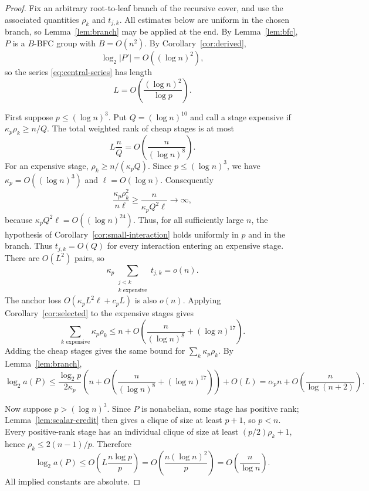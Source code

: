 \documentclass[10pt,a4paper]{amsart}
\begin{document}
\begin{proof}
Fix an arbitrary root-to-leaf branch of the recursive cover, and use the associated quantities $\rho_k$ and $t_{j,k}$. All estimates below are uniform in the chosen branch, so Lemma~\ref{lem:branch} may be applied at the end. By Lemma~\ref{lem:bfc}, $P$ is a $B$-BFC group with $B=O(n^2)$. By Corollary~\ref{cor:derived},
\[
\log_2|P'|=O((\log n)^2),
\]
so the series \eqref{eq:central-series} has length
\[
L=O\!\left(\frac{(\log n)^2}{\log p}\right).
\]

First suppose $p\le(\log n)^3$. Put $Q=(\log n)^{10}$ and call a stage expensive if $\kappa_p\rho_k\ge n/Q$. The total weighted rank of cheap stages is at most
\[
L\frac nQ=O\!\left(\frac{n}{(\log n)^8}\right).
\]
For an expensive stage, $\rho_k\ge n/(\kappa_pQ)$. Since $p\le(\log n)^3$, we have $\kappa_p=O((\log n)^3)$ and $\ell=O(\log n)$. Consequently
\[
\frac{\kappa_p\rho_k^2}{n\ell}\ge\frac{n}{\kappa_pQ^2\ell}\longrightarrow\infty,
\]
because $\kappa_pQ^2\ell=O((\log n)^{24})$. Thus, for all sufficiently large $n$, the hypothesis of Corollary~\ref{cor:small-interaction} holds uniformly in $p$ and in the branch. Thus $t_{j,k}=O(Q)$ for every interaction entering an expensive stage. There are $O(L^2)$ pairs, so
\[
\kappa_p\sum_{\substack{j<k\\ k\text{ expensive}}}t_{j,k}=o(n).
\]
The anchor loss $O(\kappa_pL^2\ell+c_pL)$ is also $o(n)$. Applying Corollary~\ref{cor:selected} to the expensive stages gives
\[
\sum_{k\text{ expensive}}\kappa_p\rho_k
\le n+O\!\left(\frac{n}{(\log n)^8}+(\log n)^{17}\right).
\]
Adding the cheap stages gives the same bound for $\sum_k\kappa_p\rho_k$. By Lemma~\ref{lem:branch},
\[
\log_2a(P)\le\frac{\log_2p}{2\kappa_p}
\left(n+O\!\left(\frac{n}{(\log n)^8}+(\log n)^{17}\right)\right)+O(L)
=\alpha_p n+O\!\left(\frac{n}{\log(n+2)}\right).
\]

Now suppose $p>(\log n)^3$. Since $P$ is nonabelian, some stage has positive rank; Lemma~\ref{lem:scalar-credit} then gives a clique of size at least $p+1$, so $p<n$. Every positive-rank stage has an individual clique of size at least $(p/2)\rho_k+1$, hence $\rho_k\le2(n-1)/p$. Therefore
\[
\log_2a(P)\le O\!\left(L\frac{n\log p}{p}\right)
=O\!\left(\frac{n(\log n)^2}{p}\right)
=O\!\left(\frac{n}{\log n}\right).
\]
All implied constants are absolute.
\end{proof}
\end{document}
